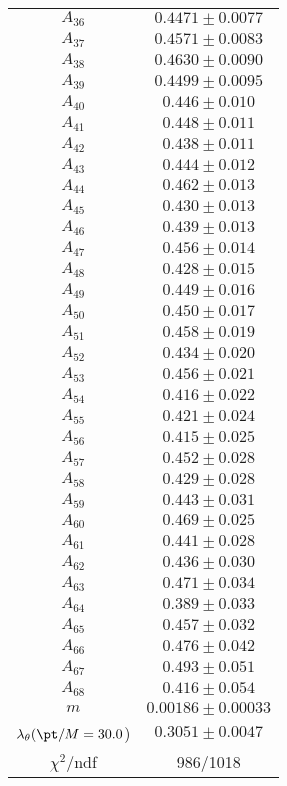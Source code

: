 \begin{tabular}{c|c}
$A_{36}$ & $0.4471\pm0.0077$ \\
$A_{37}$ & $0.4571\pm0.0083$ \\
$A_{38}$ & $0.4630\pm0.0090$ \\
$A_{39}$ & $0.4499\pm0.0095$ \\
$A_{40}$ & $0.446\pm0.010$ \\
$A_{41}$ & $0.448\pm0.011$ \\
$A_{42}$ & $0.438\pm0.011$ \\
$A_{43}$ & $0.444\pm0.012$ \\
$A_{44}$ & $0.462\pm0.013$ \\
$A_{45}$ & $0.430\pm0.013$ \\
$A_{46}$ & $0.439\pm0.013$ \\
$A_{47}$ & $0.456\pm0.014$ \\
$A_{48}$ & $0.428\pm0.015$ \\
$A_{49}$ & $0.449\pm0.016$ \\
$A_{50}$ & $0.450\pm0.017$ \\
$A_{51}$ & $0.458\pm0.019$ \\
$A_{52}$ & $0.434\pm0.020$ \\
$A_{53}$ & $0.456\pm0.021$ \\
$A_{54}$ & $0.416\pm0.022$ \\
$A_{55}$ & $0.421\pm0.024$ \\
$A_{56}$ & $0.415\pm0.025$ \\
$A_{57}$ & $0.452\pm0.028$ \\
$A_{58}$ & $0.429\pm0.028$ \\
$A_{59}$ & $0.443\pm0.031$ \\
$A_{60}$ & $0.469\pm0.025$ \\
$A_{61}$ & $0.441\pm0.028$ \\
$A_{62}$ & $0.436\pm0.030$ \\
$A_{63}$ & $0.471\pm0.034$ \\
$A_{64}$ & $0.389\pm0.033$ \\
$A_{65}$ & $0.457\pm0.032$ \\
$A_{66}$ & $0.476\pm0.042$ \\
$A_{67}$ & $0.493\pm0.051$ \\
$A_{68}$ & $0.416\pm0.054$ \\
$m$ & $0.00186\pm0.00033$ \\
$\lambda_\theta(\pt/M = 30.0$) & $0.3051\pm0.0047$ \\
\hline
$\chi^2$/ndf & 986/1018
\end{tabular}
